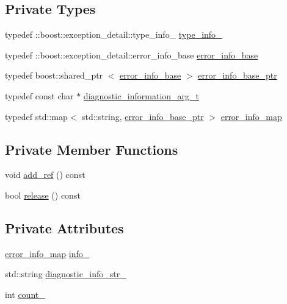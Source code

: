 \subsection*{\-Private \-Types}
\begin{DoxyCompactItemize}
\item 
typedef \*
\-::boost\-::exception\-\_\-detail\-::type\-\_\-info\-\_\- \hyperlink{classecto_1_1except_1_1error__info__container__impl_abe4f51bf533842a5e0b81f3e43ae6267}{type\-\_\-info\-\_\-}
\item 
typedef \*
\-::boost\-::exception\-\_\-detail\-::error\-\_\-info\-\_\-base \hyperlink{classecto_1_1except_1_1error__info__container__impl_a90c2628bf7c5628003cd24fd369a77da}{error\-\_\-info\-\_\-base}
\item 
typedef boost\-::shared\-\_\-ptr\*
$<$ \hyperlink{classecto_1_1except_1_1error__info__container__impl_a90c2628bf7c5628003cd24fd369a77da}{error\-\_\-info\-\_\-base} $>$ \hyperlink{classecto_1_1except_1_1error__info__container__impl_a9fbca0758380cb123f790aee77d1d4d8}{error\-\_\-info\-\_\-base\-\_\-ptr}
\item 
typedef const char $\ast$ \hyperlink{classecto_1_1except_1_1error__info__container__impl_a16f5ebd1abcacd60ddbd919ea166958e}{diagnostic\-\_\-information\-\_\-arg\-\_\-t}
\item 
typedef std\-::map$<$ std\-::string, \*
\hyperlink{classecto_1_1except_1_1error__info__container__impl_a9fbca0758380cb123f790aee77d1d4d8}{error\-\_\-info\-\_\-base\-\_\-ptr} $>$ \hyperlink{classecto_1_1except_1_1error__info__container__impl_a20b3846bc393224fe282eb64a40ee83d}{error\-\_\-info\-\_\-map}
\end{DoxyCompactItemize}
\subsection*{\-Private \-Member \-Functions}
\begin{DoxyCompactItemize}
\item 
void \hyperlink{classecto_1_1except_1_1error__info__container__impl_ae931c5c31454852cdf3d1a84d1d588eb}{add\-\_\-ref} () const 
\item 
bool \hyperlink{classecto_1_1except_1_1error__info__container__impl_a59b8d31c21da10236de67f0a5bfdf4dd}{release} () const 
\end{DoxyCompactItemize}
\subsection*{\-Private \-Attributes}
\begin{DoxyCompactItemize}
\item 
\hyperlink{classecto_1_1except_1_1error__info__container__impl_a20b3846bc393224fe282eb64a40ee83d}{error\-\_\-info\-\_\-map} \hyperlink{classecto_1_1except_1_1error__info__container__impl_a8ec60b174805696bd691a894b7f4109f}{info\-\_\-}
\item 
std\-::string \hyperlink{classecto_1_1except_1_1error__info__container__impl_aeb86496a5127e19e9f787e77531b1b83}{diagnostic\-\_\-info\-\_\-str\-\_\-}
\item 
int \hyperlink{classecto_1_1except_1_1error__info__container__impl_ade4abdc4aa11c62dd39847bc4f6c619c}{count\-\_\-}
\end{DoxyCompactItemize}
